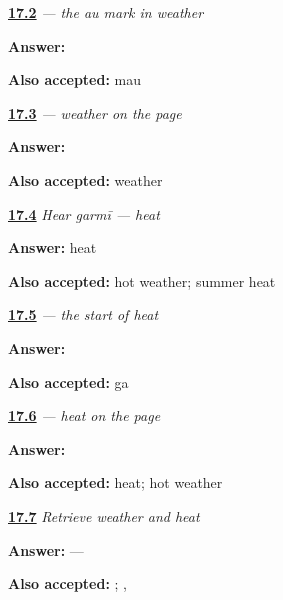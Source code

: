 \noindent\begin{minipage}[t]{\linewidth}
\raggedright
\hyperlink{review-MW-W12-au-matra-write}{\textbf{17.2}} \emph{ — the \emph{au} mark in weather}\par
\small \textbf{Answer:} \par
\footnotesize \textbf{Also accepted:}  mau
\end{minipage}\par\medskip

\noindent\begin{minipage}[t]{\linewidth}
\raggedright
\hyperlink{review-MW-C12-mausam-dictation}{\textbf{17.3}} \emph{ — weather on the page}\par
\small \textbf{Answer:} \par
\footnotesize \textbf{Also accepted:}  weather
\end{minipage}\par\medskip

\noindent\begin{minipage}[t]{\linewidth}
\raggedright
\hyperlink{review-MW-C12-hear-garmi-meaning}{\textbf{17.4}} \emph{Hear \emph{garmī} — heat}\par
\small \textbf{Answer:} heat\par
\footnotesize \textbf{Also accepted:} hot weather; summer heat
\end{minipage}\par\medskip

\noindent\begin{minipage}[t]{\linewidth}
\raggedright
\hyperlink{review-MW-W12-ga-write}{\textbf{17.5}} \emph{ — the start of heat}\par
\small \textbf{Answer:} \par
\footnotesize \textbf{Also accepted:}  ga
\end{minipage}\par\medskip

\noindent\begin{minipage}[t]{\linewidth}
\raggedright
\hyperlink{review-MW-C12-garmi-dictation}{\textbf{17.6}} \emph{ — heat on the page}\par
\small \textbf{Answer:} \par
\footnotesize \textbf{Also accepted:}  heat;  hot weather
\end{minipage}\par\medskip

\noindent\begin{minipage}[t]{\linewidth}
\raggedright
\hyperlink{review-MW-R12-weather-first-two-recall}{\textbf{17.7}} \emph{Retrieve weather and heat}\par
\small \textbf{Answer:}  — \par
\footnotesize \textbf{Also accepted:}  ; , 
\end{minipage}\par\medskip

